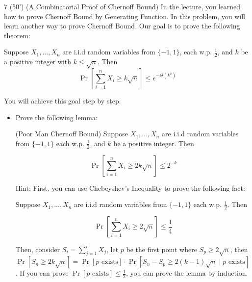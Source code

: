     
    \begin{question}{7 (50') (A Combinatorial Proof of Chernoff Bound)} 
        In the lecture, you learned how to prove Chernoff Bound by Generating Function.  In this problem, you will learn another way to prove Chernoff Bound. Our goal is to prove the following theorem: 
    
        \begin{theorem}\label{main}
        Suppose $X_1, \dots, X_n$ are i.i.d random variables from $\{-1, 1\}$, each w.p. $\frac 12$, and $k$ be a positive integer with $k\le \sqrt n$. Then $$\Pr[\sum_{i = 1} ^ n X_i \ge k \sqrt n] \le e ^ {- \Theta(k ^ 2)}$$
        \end{theorem}
    
        You will achieve this goal step by step. 
    
        
        
        \begin{itemize}
            \item[a. (10')] Prove the following lemma: 
            
            \begin{lemma} (Poor Man Chernoff Bound)
                \label{lemma: poor}
                Suppose $X_1, \dots, X_n$ are i.i.d random variables from $\{-1, 1\}$ each w.p. $\frac 12$, and $k$ be a positive integer. Then 
                
                $$\Pr[\sum_{i = 1} ^ n X_i \ge 2 k \sqrt {n}] \le 2 ^ {-k} $$
            \end{lemma}
    
            Hint:  First, you can use Chebeyshev’s Inequality to prove the following fact: 
    
            \begin{fact}
                \label{chebyshev fact}
                Suppose $X_1, \dots, X_n$ are i.i.d random variables from $\{-1, 1\}$ each w.p. $\frac 12$. Then 
    
                $$\Pr[\sum_{i = 1} ^ n X_i \ge 2 \sqrt {n}] \le \frac 14 $$
            \end{fact}
    
            Then, consider $S_i = \sum_{j = 1} ^ i X_j$, let $p$ be the first point where $S_p \ge 2 \sqrt n$, 
            then $\Pr[S_n \ge 2 k \sqrt n] = \Pr[p 
     \text{ exists}] \cdot \Pr[S_n - S_p \ge 2 (k-1) \sqrt n \mid p \text{ exists}]$. If you can prove $\Pr[p \text{ exists} ] \le \frac 12$, you can prove the lemma by induction. 
            

\end{itemize}
\end{question}
